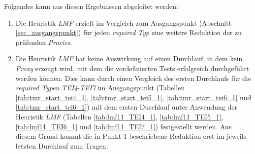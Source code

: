 \begin{multicols}{2}
\end{multicols}

\begin{multicols}{2}
\end{multicols}
\noindent
Folgendes kann aus diesen Ergebnissen abgeleitet werden:
\begin{enumerate}
\item Die \Gls{Heuristik} \emph{LMF} erzielt im Vergleich zum Ausgangspunkt (Abschnitt \ref{sec_ausgangspunkt}) für jeden \emph{required Typ} eine weitere Reduktion der zu prüfenden \emph{Proxies}.

\item Die \Gls{Heuristik} \emph{LMF} hat keine Auswirkung auf einen Durchlauf, in dem kein \emph{Proxy} erzeugt wird, mit dem die vordefinierten Tests erfolgreich durchgeführt werden können. Dies kann durch einen Vergleich des ersten Durchlaufs für die \emph{required Typen} \emph{TEI4}-\emph{TEI7} im Ausgangspunkt (Tabellen \ref{tab:tmr_start_tei4_1}, \ref{tab:tmr_start_tei5_1}, \ref{tab:tmr_start_tei6_1} und \ref{tab:tmr_start_tei6_1}) mit dem ersten Durchlauf unter Anwendung der \Gls{Heuristik} \emph{LMF} (Tabellen \ref{tab:lmf11_TEI4_1}, \ref{tab:lmf11_TEI5_1}, \ref{tab:lmf11_TEI6_1} und \ref{tab:lmf11_TEI7_1}) festgestellt werden. Aus diesem Grund kommt die in Punkt 1 beschriebene Reduktion erst im jeweils letzten Durchlauf zum Tragen.
\end{enumerate}


